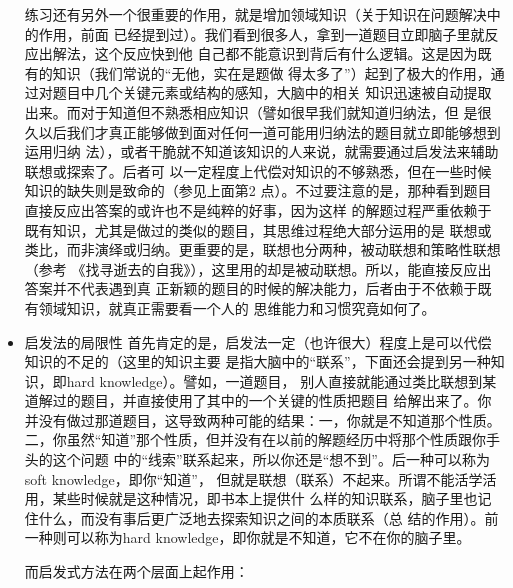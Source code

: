\documentclass[11pt]{article}
\begin{document}
\begin{itemize}
练习还有另外一个很重要的作用，就是增加领域知识（关于知识在问题解决中的作用，前面
已经提到过）。我们看到很多人，拿到一道题目立即脑子里就反应出解法，这个反应快到他
自己都不能意识到背后有什么逻辑。这是因为既有的知识（我们常说的“无他，实在是题做
得太多了”）起到了极大的作用，通过对题目中几个关键元素或结构的感知，大脑中的相关
知识迅速被自动提取出来。而对于知道但不熟悉相应知识（譬如很早我们就知道归纳法，但
是很久以后我们才真正能够做到面对任何一道可能用归纳法的题目就立即能够想到运用归纳
法），或者干脆就不知道该知识的人来说，就需要通过启发法来辅助联想或探索了。后者可
以一定程度上代偿对知识的不够熟悉，但在一些时候知识的缺失则是致命的（参见上面第2
点）。不过要注意的是，那种看到题目直接反应出答案的或许也不是纯粹的好事，因为这样
的解题过程严重依赖于既有知识，尤其是做过的类似的题目，其思维过程绝大部分运用的是
联想或类比，而非演绎或归纳。更重要的是，联想也分两种，被动联想和策略性联想（参考
《找寻逝去的自我》），这里用的却是被动联想。所以，能直接反应出答案并不代表遇到真
正新颖的题目的时候的解决能力，后者由于不依赖于既有领域知识，就真正需要看一个人的
思维能力和习惯究竟如何了。
\item 启发法的局限性
\label{sec:orgheadline206}
首先肯定的是，启发法一定（也许很大）程度上是可以代偿知识的不足的（这里的知识主要
是指大脑中的“联系”，下面还会提到另一种知识，即hard knowledge）。譬如，一道题目，
别人直接就能通过类比联想到某道解过的题目，并直接使用了其中的一个关键的性质把题目
给解出来了。你并没有做过那道题目，这导致两种可能的结果：一，你就是不知道那个性质。
二，你虽然“知道”那个性质，但并没有在以前的解题经历中将那个性质跟你手头的这个问题
中的“线索”联系起来，所以你还是“想不到”。后一种可以称为soft knowledge，即你“知道”，
但就是联想（联系）不起来。所谓不能活学活用，某些时候就是这种情况，即书本上提供什
么样的知识联系，脑子里也记住什么，而没有事后更广泛地去探索知识之间的本质联系（总
结的作用）。前一种则可以称为hard knowledge，即你就是不知道，它不在你的脑子里。

而启发式方法在两个层面上起作用：


\end{itemize}
\end{document}
